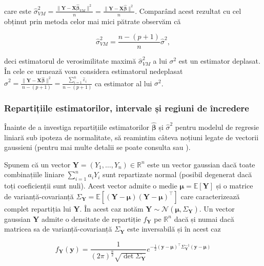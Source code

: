 \documentclass[]{article}
\begin{document}
care este
\(\hat{\sigma}_{VM}^2 = \frac{\lVert\boldsymbol Y - \boldsymbol X\hat{\boldsymbol\beta}_{VM}\rVert^2}{n}=\frac{\lVert\boldsymbol Y - \boldsymbol X\hat{\boldsymbol\beta}\rVert^2}{n}\).
Comparând acest rezultat cu cel obținut prin metoda celor mai mici
pătrate observăm că

\[
  \hat{\sigma}_{VM}^2 = \frac{n - (p+1)}{n}\hat{\sigma}^2, 
\]

deci estimatorul de verosimilitate maximă \(\hat{\sigma}_{VM}^2\) a lui
\(\sigma^2\) est un estimator deplasat. În cele ce urmează vom considera
estimatorul nedeplasat
\(\hat{\sigma}^2 = \frac{\lVert\boldsymbol Y - \boldsymbol X\hat{\boldsymbol\beta}\rVert^2}{n - (p+1)} = \frac{\sum_{i=1}^{n}\hat{\varepsilon}_i}{n - (p+1)}\)
ca estimator al lui \(\sigma^2\).

\hypertarget{repartitiile-estimatorilor-intervale-si-regiuni-de-incredere}{%
\subsubsection{Repartițiile estimatorilor, intervale și regiuni de
încredere}\label{repartitiile-estimatorilor-intervale-si-regiuni-de-incredere}}

Înainte de a investiga repartițiile estimatorilor
\(\hat{\boldsymbol\beta}\) și \(\hat{\sigma}^2\) pentru modelul de
regresie liniară sub ipoteza de normalitate, să reamintim câteva noțiuni
legate de vectorii gaussieni (pentru mai multe detalii se poate consulta
\citep[Capitolul 2]{Seber2003} sau \citep[Capitolul 16]{Jacod2003}).

Spunem că un vector \(\boldsymbol Y = (Y_1,\ldots,Y_n)\in\mathbb{R}^n\)
este un vector gaussian dacă toate combinațiile liniare
\(\sum_{i=1}^{n}a_iY_i\) sunt repartizate normal (posibil degenerat dacă
toți coeficienții sunt nuli). Acest vector admite o medie
\(\boldsymbol\mu = \mathbb{E}[\boldsymbol Y]\) și o matrice de
varianță-covarianță
\(\Sigma_{\boldsymbol Y} = \mathbb{E}[(\boldsymbol Y - \boldsymbol\mu)(\boldsymbol Y - \boldsymbol\mu)^\intercal]\)
care caracterizează complet repartiția lui \(\boldsymbol Y\). În acest
caz notăm
\(\boldsymbol Y \sim\mathcal{N}(\boldsymbol\mu, \Sigma_{\boldsymbol Y})\).
Un vector gaussian \(\boldsymbol Y\) admite o densitate de repartiție
\(f_{\boldsymbol Y}\) pe \(\mathbb{R}^n\) dacă și numai dacă matricea sa
de varianță-covarianță \(\Sigma_{\boldsymbol Y}\) este inversabilă și în
acest caz

\[
  f_{\boldsymbol Y}(\boldsymbol y) = \frac{1}{(2\pi)^{\frac{n}{2}}\sqrt{\det{\Sigma_{\boldsymbol Y}}}} e^{-\frac{1}{2}(\boldsymbol y - \boldsymbol \mu)^\intercal \Sigma_{\boldsymbol Y}^{-1}(\boldsymbol y - \boldsymbol \mu)}
\]
\end{document}
